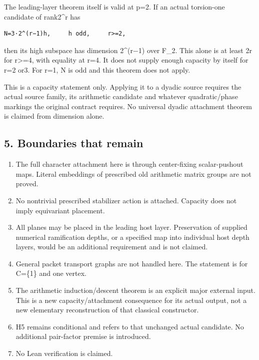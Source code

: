 The leading-layer theorem itself is valid at p=2. If an actual
torsion-one candidate of rank2\^{}r has

\begin{Verbatim}[fontsize=\small,breaklines=true,breakanywhere=true]
N=3·2^(r−1)h,     h odd,     r>=2,
\end{Verbatim}

then its high subspace has dimension 2\^{}(r−1) over F\_2. This alone is
at least 2r for r\textgreater=4, with equality at r=4. It does not
supply enough capacity by itself for r=2 or3. For r=1, N is odd and this
theorem does not apply.

This is a capacity statement only. Applying it to a dyadic source
requires the actual source family, its arithmetic candidate and whatever
quadratic/phase markings the original contract requires. No universal
dyadic attachment theorem is claimed from dimension alone.

\hypertarget{odd_capacity-boundaries-that-remain}{%
\subsection{5. Boundaries that remain}\label{odd_capacity-boundaries-that-remain}}

\begin{enumerate}
\def\labelenumi{\arabic{enumi}.}
\tightlist
\item
  The full character attachment here is through center-fixing
  scalar-pushout maps. Literal embeddings of prescribed old arithmetic
  matrix groups are not proved.
\item
  No nontrivial prescribed stabilizer action is attached. Capacity does
  not imply equivariant placement.
\item
  All planes may be placed in the leading host layer. Preservation of
  supplied numerical ramification depths, or a specified map into
  individual host depth layers, would be an additional requirement and
  is not claimed.
\item
  General packet transport graphs are not handled here. The statement is
  for C=\{1\} and one vertex.
\item
  The arithmetic induction/descent theorem is an explicit major external
  input. This is a new capacity/attachment consequence for its actual
  output, not a new elementary reconstruction of that classical
  constructor.
\item
  H5 remains conditional and refers to that unchanged actual candidate.
  No additional pair-factor premise is introduced.
\item
  No Lean verification is claimed.
\end{enumerate}

